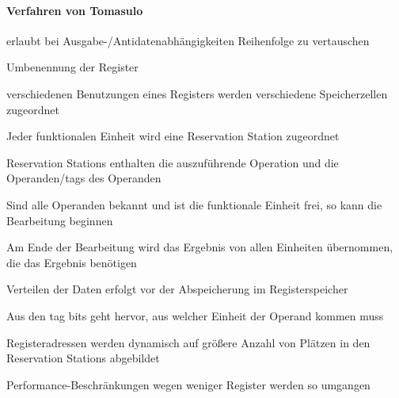 \documentclass[a4paper]{article}
\begin{document}
\begin{multicols}{3}
  \paragraph{Verfahren von Tomasulo}
  \begin{itemize*}
    \item erlaubt bei Ausgabe-/Antidatenabhängigkeiten Reihenfolge zu vertauschen
    \item Umbenennung der Register
    \item verschiedenen Benutzungen eines Registers werden verschiedene Speicherzellen zugeordnet
    \item Jeder funktionalen Einheit wird eine Reservation Station zugeordnet
    \item Reservation Stations enthalten die auszuführende Operation und die Operanden/tags des Operanden
    \item Sind alle Operanden bekannt und ist die funktionale Einheit frei, so kann die Bearbeitung beginnen
    \item Am Ende der Bearbeitung wird das Ergebnis von allen Einheiten übernommen, die das Ergebnis benötigen
    \item Verteilen der Daten erfolgt vor der Abspeicherung im Registerspeicher
    \item Aus den tag bits geht hervor, aus welcher Einheit der Operand kommen muss
    \item Registeradressen werden dynamisch auf größere Anzahl von Plätzen in den Reservation Stations abgebildet
    \item Performance-Beschränkungen wegen weniger Register werden so umgangen
  \end{itemize*}
  

\end{multicols}
\end{document}
